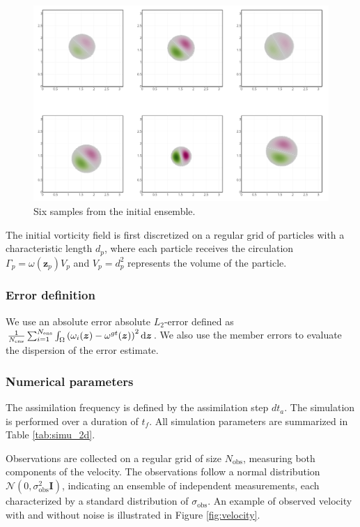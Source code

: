 \begin{figure}[ht]
	\centering
	\includegraphics[width=0.9\linewidth]{images/app2d/ensemble_sample.png}
	\caption{Six samples from the initial ensemble.}
	\label{fig:sample_ens}
\end{figure}

The initial vorticity field is first discretized on a regular grid of particles with a characteristic length $d_p$, where each particle receives the circulation $\Gamma_p = \omega(\bm z_p) V_p$ and $V_p = d_p^2$ represents the volume of the particle.

\subsubsection{Error definition}

We use an absolute error absolute \(L_2\)-error defined as $ \frac1{N_{\text{ens}}} \sum_{i = 1}^{N_{\text{ens}}} \int_\Omega \left(\omega_i(\bm{z}) - \omega^{gt}(\bm{z})\right)^2 \mathrm{d}\bm{z}$.
We also use the member errors to evaluate the dispersion of the error estimate.

\subsubsection{Numerical parameters}

The assimilation frequency is defined by the assimilation step $dt_a$. The simulation is performed over a duration of $t_f$. All simulation parameters are summarized in Table \ref{tab:simu_2d}.

Observations are collected on a regular grid of size $N_{\text{obs}}$, measuring both components of the velocity. The observations follow a normal distribution $\mathcal N(0, \sigma_{\text{obs}}^2 \bm{I})$, indicating an ensemble of independent measurements, each characterized by a standard distribution of $\sigma_{\text{obs}}$. An example of observed velocity with and without noise is illustrated in Figure \ref{fig:velocity}.

